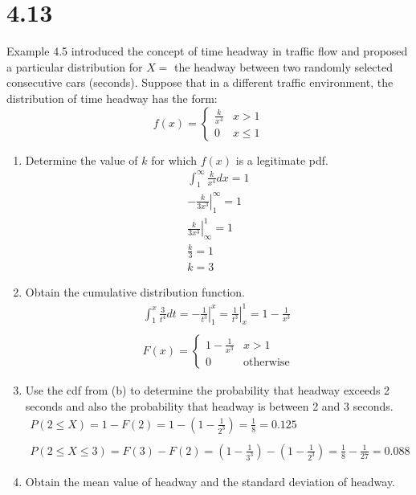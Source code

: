 \documentclass[letterpaper,12pt,fleqn]{article}
\begin{document}
\section*{4.13}

Example 4.5 introduced the concept of time headway in traffic flow and proposed a particular distribution for \(X=\) the
headway between two randomly selected consecutive cars (seconds).  Suppose that in a different traffic environment, the
distribution of time headway has the form:
\[f(x)=\begin{cases}
\frac{k}{x^4} & x>1 \\
0 & x\le1
\end{cases}\]
\begin{enumerate}[label={\alph*)}]
\item Determine the value of \(k\) for which \(f(x)\) is a legitimate pdf.
  \begin{gather*}
    \int_1^{\infty}\frac{k}{x^4}dx=1 \\
    \left.-\frac{k}{3x^3}\right|_1^{\infty}=1 \\
    \left.\frac{k}{3x^3}\right|_{\infty}^1=1 \\
    \frac{k}{3}=1 \\
    k=3
  \end{gather*}
\item Obtain the cumulative distribution function.
  \begin{gather*}
    \int_1^x\frac{3}{t^4}dt=\left.-\frac{1}{t^3}\right|_1^x=\left.\frac{1}{t^3}\right|_x^1=1-\frac{1}{x^3} \\
    \\
    F(x)=\begin{cases}
    1-\frac{1}{x^3} & x>1 \\
    0 & \text{otherwise}
    \end{cases}
  \end{gather*}
\item Use the cdf from (b) to determine the probability that headway exceeds 2 seconds and also the probability that
  headway is between 2 and 3 seconds.
  \begin{gather*}
    P(2\le X)=1-F(2)=1-\left(1-\frac{1}{2^3}\right)=\frac{1}{8}=0.125 \\
    \\
    P(2\le X\le 3)=F(3)-F(2)=\left(1-\frac{1}{3^3}\right)-\left(1-\frac{1}{2^3}\right)=\frac{1}{8}-\frac{1}{27}=0.088
  \end{gather*}
\item Obtain the mean value of headway and the standard deviation of headway.

\end{enumerate}
\end{document}
